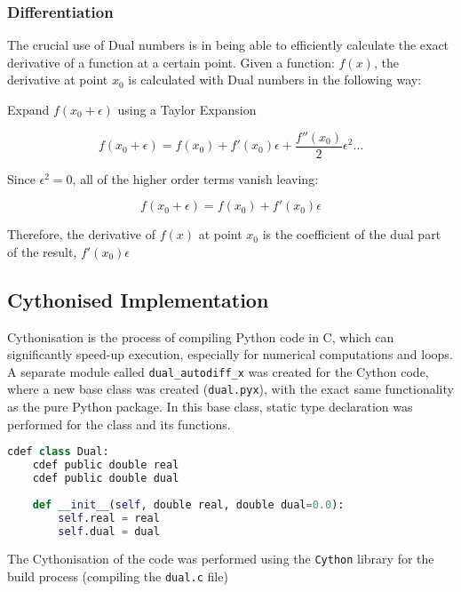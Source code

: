 \subsubsection{Differentiation}
The crucial use of Dual numbers is in being able to efficiently calculate the exact derivative of a function at a certain point.
Given a function: $f(x)$, the derivative at point $x_0$ is calculated with Dual numbers in the following way:

Expand $f(x_0 + \epsilon)$ using a Taylor Expansion

\begin{equation}
    f(x_0 + \epsilon) = f(x_0) + f'(x_0) \epsilon + \frac{f''(x_0)}{2} \epsilon^2 \dots
    \label{eq:taylor_exp}
\end{equation}

Since $\epsilon^2 = 0$, all of the higher order terms vanish leaving:

\begin{equation}
    f(x_0 + \epsilon) = f(x_0) + f'(x_0) \epsilon
    \label{eq:taylor_exp_no_higher}
\end{equation}

Therefore, the derivative of $f(x)$ at point $x_0$ is the coefficient of the dual part of the result, 
$f'(x_0) \epsilon$

\subsection{Cythonised Implementation}
Cythonisation is the process of compiling Python code in C, 
which can significantly speed-up execution, especially for numerical computations and loops. \\

A separate module called \texttt{dual\_autodiff\_x} was created for the Cython code, 
where a new base class was created (\texttt{dual.pyx}), with the exact same functionality as the pure Python package.
In this base class, static type declaration was performed for the class and its functions.

\begin{lstlisting}[language=Python]
cdef class Dual:
    cdef public double real
    cdef public double dual
    
    def __init__(self, double real, double dual=0.0):
        self.real = real
        self.dual = dual
\end{lstlisting}

The Cythonisation of the code was performed using the \texttt{Cython} 
library for the build process (compiling the \texttt{dual.c} file)

